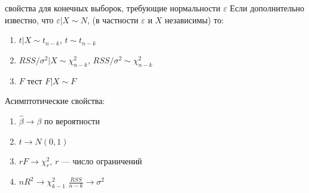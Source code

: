 \documentclass[12pt,a4paper]{article}
\begin{document}
свойства для конечных выборок, требующие нормальности $\varepsilon$
Если дополнительно известно, что $\varepsilon |X \sim N$, (в частности $\varepsilon$ и $X$ независимы) то:
\begin{enumerate}
\item $t|X \sim t_{n-k}$, $t\sim t_{n-k}$
\item  $RSS/\sigma^2 |X \sim \chi^2_{n-k}$, $RSS/\sigma^2 \sim \chi^2_{n-k}$
\item $F$ тест $F|X \sim F$
\end{enumerate}

Асимптотические свойства:
\begin{enumerate}
\item  $\hat{\beta} \to \beta$ по вероятности

\item $t \to N(0,1)$
\item  $rF \to \chi^2_r$, $r$ --- число ограничений
\item  $nR^2 \to \chi^2_{k-1}$
$\frac{RSS}{n-k} \to \sigma^2 $
\end{enumerate}
\end{document}
